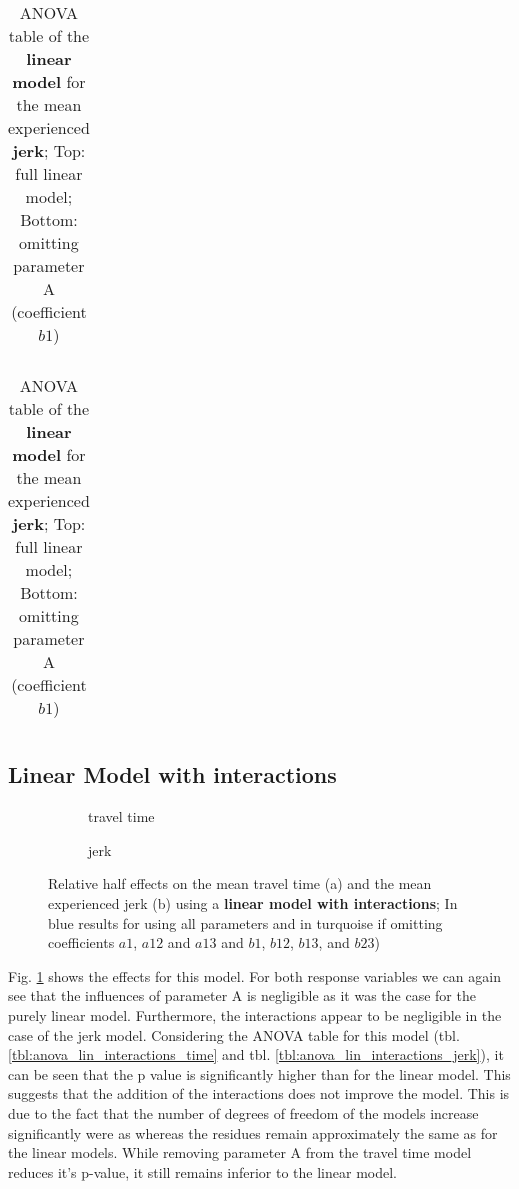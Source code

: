 \begin{table}[h!]
	\centering

	\begin{tabular}{l r r r r r}
	
	\end{tabular}

	\bigskip

	\begin{tabular}{l r r r r r}
		
	\end{tabular}

	\caption{ANOVA table of the \textbf{linear model} for the mean experienced \textbf{jerk}; Top: full linear model; Bottom: omitting parameter A (coefficient $b1$)}\label{tbl:anova_lin_jerk}
\end{table}


\subsection{Linear Model with interactions}

\begin{figure}[h]
    \centering
    \begin{subfigure}[b]{0.5\textwidth}
	    \setlength{\abovecaptionskip}{1pt plus 3pt minus 0pt}
	    
	    \caption{travel time}
	\end{subfigure}
    \begin{subfigure}[b]{0.5\textwidth}
		\setlength{\abovecaptionskip}{1pt plus 3pt minus 0pt}	
	    
   	    \caption{jerk}
	\end{subfigure}
	
    \caption{Relative half effects on the mean travel time (a) and the mean experienced jerk (b) using a \textbf{linear model with interactions}; In blue results for using all parameters and in turquoise if omitting coefficients $a1$, $a12$ and $a13$ and $b1$, $b12$, $b13$, and $b23$)}\label{fig:effects_lin_interactions}
\end{figure} 
Fig. \ref{fig:effects_lin_interactions} shows the effects for this model. For both response variables we can again see that the influences of parameter A is negligible as it was the case for the purely linear model. Furthermore, the interactions appear to be negligible in the case of the jerk model. Considering the ANOVA table for this model (tbl. \ref{tbl:anova_lin_interactions_time} and tbl. \ref{tbl:anova_lin_interactions_jerk}), it can be seen that the p value is significantly higher than for the linear model. This suggests that the addition of the interactions does not improve the model. This is due to the fact that the number of degrees of freedom of the models increase significantly were as whereas the residues remain approximately the same as for the linear models. While removing parameter A from the travel time model reduces it's p-value, it still remains inferior to the linear model.

